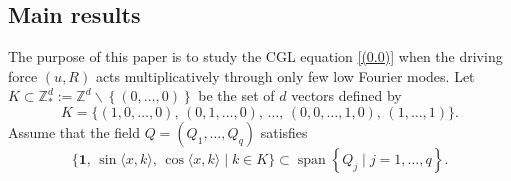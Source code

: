 \documentclass[review]{elsarticle}
\theoremstyle{dotless}
\numberwithin{equation}{section}
\begin{document}
\subsection{Main results}
The purpose of this paper is to study the CGL equation \eqref{(0.0)} when the driving force $(u,R)$ acts multiplicatively through only few low Fourier modes. 
Let $K \subset \mathbb{Z}_*^d:= \mathbb{Z}^d\backslash\left\{(0, \ldots, 0)\right\}$ be the set of $d$ vectors defined by
\begin{equation}\label{(0.3)}
K=\{(1,0, \ldots, 0),\,(0,1, \ldots, 0),\, \ldots,\,(0,0, \ldots, 1,0),\,(1, \ldots, 1)\}.
\end{equation}
Assume that the field $Q=\left(Q_1, \ldots, Q_q\right)$ satisfies
\begin{equation}\label{(0.4)}
\{\mathbf{1},\, \sin \langle x, k\rangle,\, \cos \langle x, k\rangle\mid k \in K\} \subset \operatorname{span}\left\{Q_j\mid j=1, \ldots, q\right\}.
\end{equation}
\end{document}

